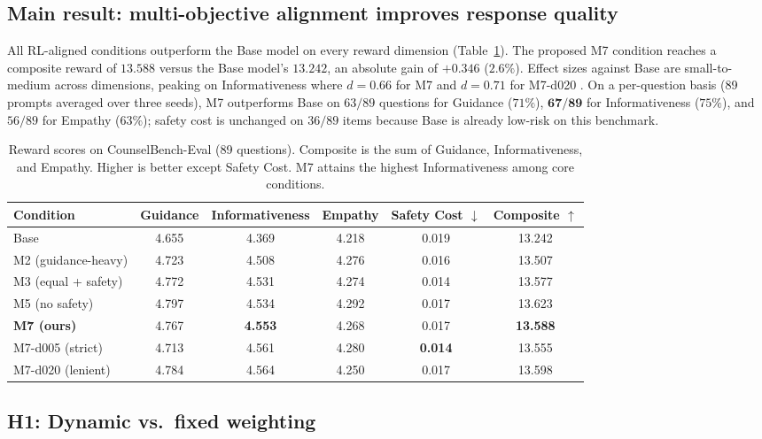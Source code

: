 \documentclass[10pt,twocolumn]{article}
\begin{document}
\subsection*{Main result: multi-objective alignment improves response quality}

All RL-aligned conditions outperform the Base model on every reward dimension (Table~\ref{tab:main_rewards}). The proposed M7 condition reaches a composite reward of $13.588$ versus the Base model's $13.242$, an absolute gain of $+0.346$ ($2.6\%$). Effect sizes against Base are small-to-medium across dimensions, peaking on Informativeness where $d=\mathbf{0.66}$ for M7 and $d=0.71$ for M7-d020 \citep{cohen1988statistical}. On a per-question basis (89 prompts averaged over three seeds), M7 outperforms Base on $63/89$ questions for Guidance ($71\%$), $\mathbf{67/89}$ for Informativeness ($75\%$), and $56/89$ for Empathy ($63\%$); safety cost is unchanged on $36/89$ items because Base is already low-risk on this benchmark.

\begin{table}[!t]
\centering
\small
\begin{tabular}{lccccc}
\toprule
Condition & Guidance & Informativeness & Empathy & Safety Cost $\downarrow$ & Composite $\uparrow$ \\
\midrule
Base                & 4.655 & 4.369 & 4.218 & 0.019 & 13.242 \\
M2 (guidance-heavy) & 4.723 & 4.508 & 4.276 & 0.016 & 13.507 \\
M3 (equal + safety) & 4.772 & 4.531 & 4.274 & 0.014 & 13.577 \\
M5 (no safety)      & 4.797 & 4.534 & 4.292 & 0.017 & 13.623 \\
\textbf{M7 (ours)}  & 4.767 & \textbf{4.553} & 4.268 & 0.017 & \textbf{13.588} \\
M7-d005 (strict)    & 4.713 & 4.561 & 4.280 & \textbf{0.014} & 13.555 \\
M7-d020 (lenient)   & 4.784 & 4.564 & 4.250 & 0.017 & 13.598 \\
\bottomrule
\end{tabular}
\caption{Reward scores on CounselBench-Eval (89 questions). Composite is the sum of Guidance, Informativeness, and Empathy. Higher is better except Safety Cost. M7 attains the highest Informativeness among core conditions.}
\label{tab:main_rewards}
\end{table}

\subsection*{H1: Dynamic vs.\ fixed weighting}
\end{document}
